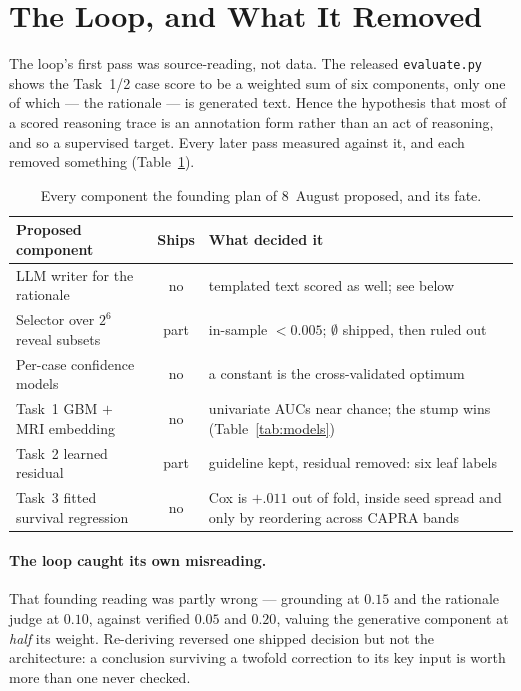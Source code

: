 \documentclass[runningheads]{llncs}
\newcommand{\code}[1]{\texttt{\small #1}}
\begin{document}
\section{The Loop, and What It Removed}
\label{sec:loop}


The loop's first pass was source-reading, not data. The released \code{evaluate.py}
shows the Task~1/2 case score to be a weighted sum of six components, only one of
which --- the rationale --- is generated text. Hence the hypothesis that most of a
scored reasoning trace is an annotation form rather than an act of reasoning, and so a
supervised target. Every later pass measured against it, and each removed something
(Table~\ref{tab:removed}).

\begin{table}[htbp]
\caption{Every component the founding plan of 8~August proposed, and its fate.}
\label{tab:removed}
\centering\footnotesize
\setlength{\tabcolsep}{4pt}
\renewcommand{\arraystretch}{0.94}
\begin{tabular}{p{3.9cm}cp{6.4cm}}
\toprule
Proposed component & Ships & What decided it \\
\midrule
LLM writer for the rationale & no &
  templated text scored as well; see below \\
Selector over $2^6$ reveal subsets & part &
  in-sample ${<}0.005$; $\emptyset$ shipped, then ruled out \\
Per-case confidence models & no &
  a constant is the cross-validated optimum \\
Task~1 GBM $+$ MRI embedding & no &
  univariate AUCs near chance; the stump wins (Table~\ref{tab:models}) \\
Task~2 learned residual & part &
  guideline kept, residual removed: six leaf labels \\
Task~3 fitted survival regression & no &
  Cox is $+.011$ out of fold, inside seed spread and only by reordering
  across CAPRA bands \\
\bottomrule
\end{tabular}
\end{table}

\paragraph{The loop caught its own misreading.}
That founding reading was partly wrong --- grounding at $0.15$ and the rationale judge
at $0.10$, against verified $0.05$ and $0.20$, valuing the generative component at
\emph{half} its weight. Re-deriving reversed one shipped decision but not the
architecture: a conclusion surviving a twofold correction to its key input is worth
more than one never checked.
\end{document}
